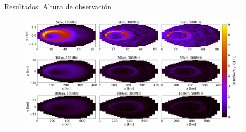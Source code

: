 \documentclass{beamer}
\begin{document}
\begin{frame}{Resultados: Altura de observación}
	\begin{figure}[H]
		\centering
		\includegraphics[width=1\linewidth]{figures/Radio_UG/85deg_varh_5_36_100}
	\end{figure}
\end{frame}
\end{document}
